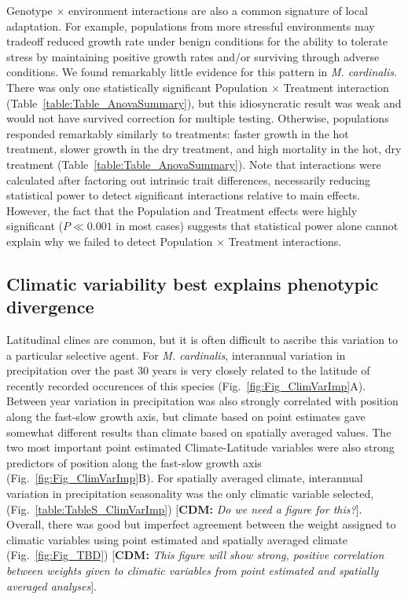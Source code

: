 \documentclass[11pt, oneside]{article}
\newcommand{\cdm}[1]{{ \color{magenta} [{\bf{CDM:}} {\em#1}]}} %
\begin{document}
Genotype $\times$ environment interactions are also a common signature of local adaptation. For example, populations from more stressful environments may tradeoff reduced growth rate under benign conditions for the ability to tolerate stress by maintaining positive growth rates and/or surviving through adverse conditions. We found remarkably little evidence for this pattern in \textit{M. cardinalis}. There was only one statistically significant Population $\times$ Treatment interaction (Table~\ref{table:Table_AnovaSummary}), but this idiosyncratic result was weak and would not have survived correction for multiple testing. Otherwise, populations responded remarkably similarly to treatments: faster growth in the hot treatment, slower growth in the dry treatment, and high mortality in the hot, dry treatment (Table~\ref{table:Table_AnovaSummary}). Note that interactions were calculated after factoring out intrinsic trait differences, necessarily reducing statistical power to detect significant interactions relative to main effects. However, the fact that the Population and Treatment effects were highly significant ($P \ll 0.001$ in most cases) suggests that statistical power alone cannot explain why we failed to detect Population $\times$ Treatment interactions.

\subsection*{Climatic variability best explains phenotypic divergence}

Latitudinal clines are common, but it is often difficult to ascribe this variation to a particular selective agent. For \textit{M. cardinalis}, interannual variation in precipitation over the past 30 years is very closely related to the latitude of recently recorded occurences of this species (Fig.~\ref{fig:Fig_ClimVarImp}A). Between year variation in precipitation was also strongly correlated with position along the fast-slow growth axis, but climate based on point estimates gave somewhat different results than climate based on spatially averaged values. The two most important point estimated Climate-Latitude variables were also strong predictors of position along the fast-slow growth axis (Fig.~\ref{fig:Fig_ClimVarImp}B). For spatially averaged climate, interannual variation in precipitation seasonality was the only climatic variable selected, (Fig.~\ref{table:TableS_ClimVarImp}) \cdm{Do we need a figure for this?}. Overall, there was good but imperfect agreement between the weight assigned to climatic variables using point estimated and spatially averaged climate (Fig.~\ref{fig:Fig_TBD}) \cdm{This figure will show strong, positive correlation between weights given to climatic variables from point estimated and spatially averaged analyses}.
\end{document}
